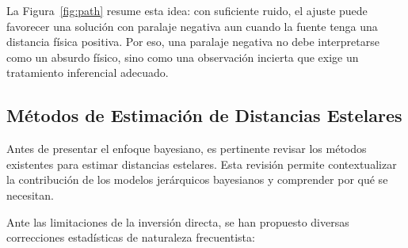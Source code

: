 \documentclass[stu, 12pt, letterpaper, donotrepeattitle, floatsintext, natbib]{apa7_ula}
\begin{document}
La Figura~\ref{fig:path} resume esta idea: con suficiente ruido, el
ajuste puede favorecer una solución con paralaje negativa aun cuando
la fuente tenga una distancia física positiva. Por eso, una paralaje
negativa no debe interpretarse como un absurdo físico, sino como una
observación incierta que exige un tratamiento inferencial adecuado.


\subsection{Métodos de Estimación de Distancias Estelares}

Antes de presentar el enfoque bayesiano, es pertinente revisar los
métodos existentes para estimar distancias estelares. Esta revisión permite
contextualizar la contribución de los modelos jerárquicos bayesianos
y comprender por qué se necesitan.

Ante las limitaciones de la inversión directa, se han propuesto
diversas correcciones estadísticas de naturaleza frecuentista:
\end{document}
